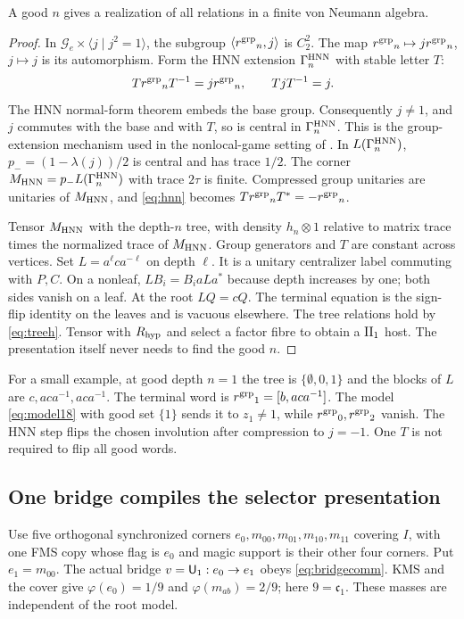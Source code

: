 \begin{lemma}\label{lem:hnn}
A good $n$ gives a realization of all relations in a finite von Neumann algebra.
\end{lemma}
\begin{proof}
In $\mathcal G_e\times\langle j\mid j^2=1\rangle$, the subgroup $\langle {r^{\rm grp}}_n,j\rangle$ is $C_2^2$. The map ${r^{\rm grp}}_n\mapsto j{r^{\rm grp}}_n$, $j\mapsto j$ is its automorphism. Form the HNN extension $\Gamma^{\rm HNN}_n$ with stable letter $T$:
\begin{equation}\label{eq:hnn}
 T{r^{\rm grp}}_nT^{-1}=j{r^{\rm grp}}_n,\qquad TjT^{-1}=j.
\end{equation}
The HNN normal-form theorem \cite{HNN} embeds the base group. Consequently $j\ne1$, and $j$ commutes with the base and with $T$, so is central in $\Gamma^{\rm HNN}_n$. This is the group-extension mechanism used in the nonlocal-game setting of \cite{Slofstra}. In $L(\Gamma^{\rm HNN}_n)$, $p_-=(1-\lambda(j))/2$ is central and has trace $1/2$. The corner $M_{\rm HNN}=p_-L(\Gamma^{\rm HNN}_n)$ with trace $2\tau$ is finite. Compressed group unitaries are unitaries of $M_{\rm HNN}$, and \eqref{eq:hnn} becomes $T{r^{\rm grp}}_nT^*=-{r^{\rm grp}}_n$.

Tensor $M_{\rm HNN}$ with the depth-$n$ tree, with density $h_n\otimes1$ relative to matrix trace times the normalized trace of $M_{\rm HNN}$. Group generators and $T$ are constant across vertices. Set $L=a^\ell ca^{-\ell}$ on depth $\ell$. It is a unitary centralizer label commuting with $P,C$. On a nonleaf, $LB_i=B_i aLa^*$ because depth increases by one; both sides vanish on a leaf. At the root $LQ=cQ$. The terminal equation is the sign-flip identity on the leaves and is vacuous elsewhere. The tree relations hold by \eqref{eq:treeh}. Tensor with $R_{\rm hyp}$ and select a factor fibre to obtain a $\mathrm{II}_1$ host. The presentation itself never needs to find the good $n$.
\end{proof}

For a small example, at good depth $n=1$ the tree is $\{\emptyset,0,1\}$ and the blocks of $L$ are $c,aca^{-1},aca^{-1}$. The terminal word is ${r^{\rm grp}}_1=[b,aca^{-1}]$. The model \eqref{eq:model18} with good set $\{1\}$ sends it to $z_1\ne1$, while ${r^{\rm grp}}_0,{r^{\rm grp}}_2$ vanish. The HNN step flips the chosen involution after compression to $j=-1$. One $T$ is not required to flip all good words.

\subsection{One bridge compiles the selector presentation}\label{sec:onebridge}
Use five orthogonal synchronized corners $e_0,m_{00},m_{01},m_{10},m_{11}$ covering $I$, with one FMS copy whose flag is $e_0$ and magic support is their other four corners. Put $e_1=m_{00}$. The actual bridge $v=\mathsf U_1:e_0\to e_1$ obeys \eqref{eq:bridgecomm}. KMS and the cover give $\varphi(e_0)=1/9$ and $\varphi(m_{ab})=2/9$; here $9=\mathfrak c_1$. These masses are independent of the root model.

